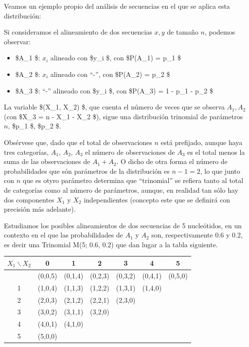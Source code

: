 \documentclass[
]{article}
\providecommand{\tightlist}{%
  \setlength{\itemsep}{0pt}\setlength{\parskip}{0pt}}
\begin{document}
Veamos un ejemplo propio del análisis de secuencias en el que se aplica esta distribución:

Si consideramos el alineamiento de dos secuencias \(x, y\) de tamaño \(n\), podemos observar:

\begin{itemize}
\tightlist
\item
  \$A\_1 \$: \(x_i\) alineado con \$y\_i \$, con \$P(A\_1) = p\_1 \$
\item
  \$A\_2 \$: \(x_i\) alineado con ``-'', con \$P(A\_2) = p\_2 \$
\item
  \$A\_3 \$: ``-'' alineado con \$y\_i \$, con \$P(A\_3) = 1 - p\_1 - p\_2 \$
\end{itemize}

La variable \$(X\_1, X\_2) \$, que cuenta el número de veces que se observa \(A_1, A_2\) (con \$X\_3 = n - X\_1 - X\_2 \$), sigue una distribución trinomial de parámetros \(n\), \$p\_1 \$, \$p\_2 \$.

Obsérvese que, dado que el total de observaciones \(n\) está prefijado, aunque haya tres categorías, \(A_1\), \(A_2\), \(A_3\) el número de observaciones de \(A_3\) es el total menos la suma de las observaciones de \(A_1+A_2\). O dicho de otra forma el número de probabilidades que són parámetros de la distribución es \(n-1=2\), lo que junto con \(n\) que es otyro parámetro determina que ``trinomial'' se refiera tanto al total de categorías como al número de parámetros, aunque, en realidad tan sólo hay dos componentes \(X_1\) y \(X_2\) independientes (concepto este que se definirá con precisión más adelante).

Estudiamos los posibles alineamientos de dos secuencias de 5 nucleótidos, en un contexto en el que las probabilidades de \(A_1\) y \(A_2\) son, respectivamente 0.6 y 0.2, es decir una Trinomial M(5; 0.6, 0.2) que dan lugar a la tabla siguiente.

\begin{longtable}[]{@{}ccccccc@{}}
\toprule\noalign{}
\(X_{1} \backslash X_{2}\) & 0 & 1 & 2 & 3 & 4 & 5 \\
\midrule\noalign{}
\endhead
\bottomrule\noalign{}
\endlastfoot
0 & (0,0,5) & (0,1,4) & (0,2,3) & (0,3,2) & (0,4,1) & (0,5,0) \\
1 & (1,0,4) & (1,1,3) & (1,2,2) & (1,3,1) & (1,4,0) & \\
2 & (2,0,3) & (2,1,2) & (2,2,1) & (2,3,0) & & \\
3 & (3,0,2) & (3,1,1) & (3,2,0) & & & \\
4 & (4,0,1) & (4,1,0) & & & & \\
5 & (5,0,0) & & & & & \\
\end{longtable}
\end{document}

